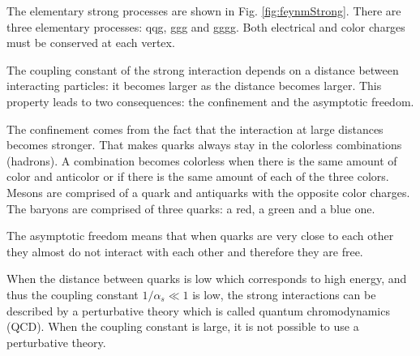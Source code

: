 The elementary strong processes are shown in Fig. \ref{fig:feynmStrong}. There are three elementary processes: qqg, ggg and gggg. Both electrical and color charges must be conserved at each vertex.

The coupling constant of the strong interaction depends on a distance between interacting particles: it becomes larger as the distance becomes larger. This property leads to two consequences: the confinement and the asymptotic freedom.

The confinement comes from the fact that the interaction at large distances becomes stronger. That makes quarks always stay in the colorless combinations (hadrons). A combination becomes colorless when there is the same amount of color and anticolor or if there is the same amount of each of the three colors.  Mesons are comprised of a quark and antiquarks with the opposite color charges. The baryons are comprised of three quarks: a red, a green and a blue one.

The asymptotic freedom means that when quarks are very close to each other they almost do not interact with each other and therefore they are free. 

When the distance between quarks is low which corresponds to high energy, and thus the coupling constant $1/\alpha_s \ll 1$ is low, the strong interactions can be described by a perturbative theory which is called quantum chromodynamics (QCD). When the coupling constant is large, it is not possible to use a perturbative theory. 
